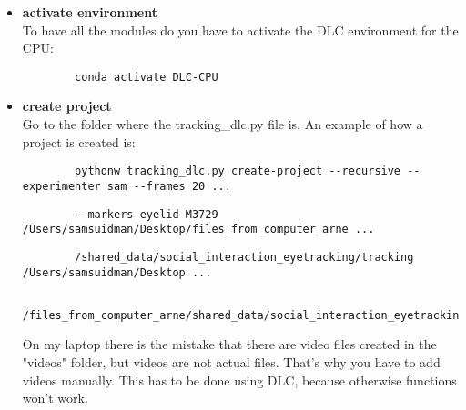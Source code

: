 \documentclass{article}
\begin{document}
\begin{itemize}
    \item \textbf{activate environment} \\
    To have all the modules do you have to activate the DLC environment for the CPU: \\
    \begin{verbatim}
        conda activate DLC-CPU
    \end{verbatim}

    \item \textbf{create project} \\
    Go to the folder where the tracking\_dlc.py file is.
    An example of how a project is created is:
    \begin{verbatim}
        pythonw tracking_dlc.py create-project --recursive --experimenter sam --frames 20 ...
    \end{verbatim}
    \begin{verbatim}
        --markers eyelid M3729 /Users/samsuidman/Desktop/files_from_computer_arne ...
    \end{verbatim}
    \begin{verbatim}
        /shared_data/social_interaction_eyetracking/tracking /Users/samsuidman/Desktop ...
    \end{verbatim}
    \begin{verbatim}
        /files_from_computer_arne/shared_data/social_interaction_eyetracking/database/M3729
    \end{verbatim}
    
    On my laptop there is the mistake that there are video files created in the "videos" folder, but videos are not actual files. That's why you have to add videos manually. This has to be done using DLC, because otherwise functions won't work.
    

\end{itemize}
\end{document}
